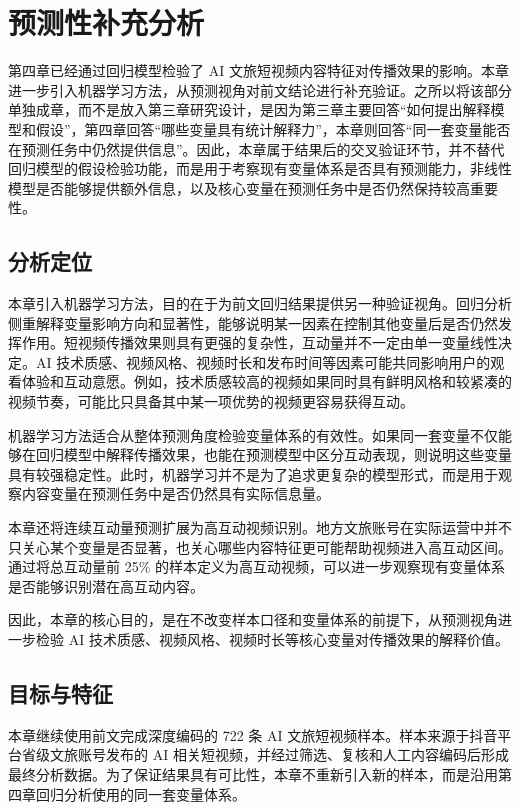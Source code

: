 \chapter{预测性补充分析}

第四章已经通过回归模型检验了 AI 文旅短视频内容特征对传播效果的影响。本章进一步引入机器学习方法，从预测视角对前文结论进行补充验证。之所以将该部分单独成章，而不是放入第三章研究设计，是因为第三章主要回答“如何提出解释模型和假设”，第四章回答“哪些变量具有统计解释力”，本章则回答“同一套变量能否在预测任务中仍然提供信息”。因此，本章属于结果后的交叉验证环节，并不替代回归模型的假设检验功能，而是用于考察现有变量体系是否具有预测能力，非线性模型是否能够提供额外信息，以及核心变量在预测任务中是否仍然保持较高重要性。

\section{分析定位}

本章引入机器学习方法，目的在于为前文回归结果提供另一种验证视角。回归分析侧重解释变量影响方向和显著性，能够说明某一因素在控制其他变量后是否仍然发挥作用。短视频传播效果则具有更强的复杂性，互动量并不一定由单一变量线性决定。AI 技术质感、视频风格、视频时长和发布时间等因素可能共同影响用户的观看体验和互动意愿。例如，技术质感较高的视频如果同时具有鲜明风格和较紧凑的视频节奏，可能比只具备其中某一项优势的视频更容易获得互动。

机器学习方法适合从整体预测角度检验变量体系的有效性。如果同一套变量不仅能够在回归模型中解释传播效果，也能在预测模型中区分互动表现，则说明这些变量具有较强稳定性。此时，机器学习并不是为了追求更复杂的模型形式，而是用于观察内容变量在预测任务中是否仍然具有实际信息量。

本章还将连续互动量预测扩展为高互动视频识别。地方文旅账号在实际运营中并不只关心某个变量是否显著，也关心哪些内容特征更可能帮助视频进入高互动区间。通过将总互动量前 25\% 的样本定义为高互动视频，可以进一步观察现有变量体系是否能够识别潜在高互动内容。

因此，本章的核心目的，是在不改变样本口径和变量体系的前提下，从预测视角进一步检验 AI 技术质感、视频风格、视频时长等核心变量对传播效果的解释价值。

\section{目标与特征}

本章继续使用前文完成深度编码的 722 条 AI 文旅短视频样本。样本来源于抖音平台省级文旅账号发布的 AI 相关短视频，并经过筛选、复核和人工内容编码后形成最终分析数据。为了保证结果具有可比性，本章不重新引入新的样本，而是沿用第四章回归分析使用的同一套变量体系。

